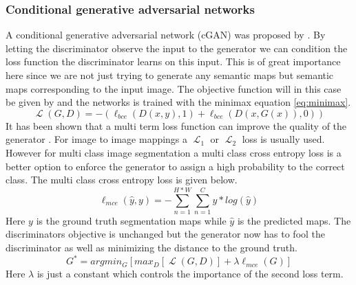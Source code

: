 \documentclass[a4paper,11pt]{article}
\DeclareMathOperator{\Lagr}{\mathcal{L}}
\begin{document}
\subsubsection{Conditional generative adversarial networks}
A conditional generative adversarial network (cGAN) was proposed by \cite{mirza_conditional_2014}.
By letting the discriminator observe the input to the generator we can condition the loss function the discriminator learns on this input. This is of great importance here since we are not just trying to generate any semantic maps but semantic maps corresponding to the input image. The objective function will in this case be given by and the networks is trained with the minimax equation \eqref{eq:minimax}.
\begin{equation}
\Lagr(G, D) =  -(\ell_{bce}(D(x, y), 1) + \ell_{bce}(D(x, G(x)), 0))
\end{equation}
It has been shown that a multi term loss function can improve the quality of the generator \cite{pathak_context_2016, isola_image--image_2016}. For image to image mappings a $\Lagr_1$ or $\Lagr_2$ loss is usually used. However for multi class image segmentation a multi class cross entropy loss is a better option to enforce the generator to assign a high probability to the correct class. The multi class cross entropy loss is given below.
\begin{equation}\label{eq:mce}
\ell_{mce}(\hat{y}, y) = - \sum_{n=1}^{H*W} \sum_{n=1}^{C}y*log(\hat{y})
\end{equation}
Here $y$ is the ground truth segmentation maps while $\hat{y}$ is the predicted maps. The discriminators objective is unchanged but the generator now has to fool the discriminator as well as minimizing the distance to the ground truth.
\begin{equation}
G^{*}=argmin_{G}[max_{D}[\Lagr(G, D)] + \lambda \ell_{mce}(G)]
\end{equation}
Here $\lambda$ is just a constant which controls the importance of the second  loss term.
\end{document}
